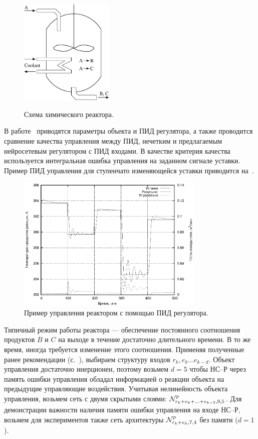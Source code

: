 \begin{figure}
\centering
\includegraphics[width=0.4\textwidth,%
  totalheight=0.3\textheight]{cstr_picture}\\
\caption{Схема химического реактора.}%
\label{fig:cstr_picture}
\end{figure}


В работе~\cite{vas-bak2009} приводятся параметры объекта и ПИД
регулятора, а также проводится сравнение качества управления между
ПИД, нечетким и предлагаемым нейросетевым регулятором с ПИД входами.
В качестве критерия качества используется интегральная ошибка
управления на заданном сигнале уставки.  Пример ПИД управления для
ступенчато изменяющейся уставки приводится
на~.

\begin{figure}[h]
\centering
\includegraphics[width=0.8\textwidth,%
  totalheight=0.35\textheight]{cstr_pid_ru}
\caption{Пример управления реактором с помощью ПИД регулятора.}%
\label{fig:cstr_pid_ru}
\end{figure}

Типичный режим работы реактора --- обеспечение постоянного соотношения
продуктов $B$ и $C$ на выходе в течение достаточно длительного
времени.  В то же время, иногда требуется изменение этого соотношения.
Применяя полученные ранее рекомендации
(с.~\pageref{nnc-inputs-rules}), выбираем структуру входов
$r_k,e_k\ldots e_{k-d}$.  Объект управления достаточно инерционен,
поэтому возьмем $d=5$ чтобы НС--Р через память ошибки управления
обладал информацией о реакции объекта на предыдущие управляющие
воздействия.  Учитывая нелинейность объекта управления, возьмем сеть с
двумя скрытыми слоями: $\mathcal{N}^p_{r_k+e_k+\ldots+e_{k-5},9,5}$.  Для
демонстрации важности наличия памяти ошибки управления на входе НС--Р,
возьмем для экспериментов также сеть архитектуры $\mathcal{N}^p_{r_k+e_k,7,4}$
без памяти ($d=1$).

